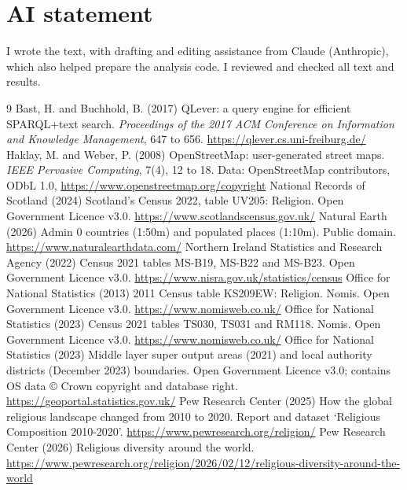 \documentclass[11pt,a4paper]{article}
\begin{document}
\section*{AI statement}
I wrote the text, with drafting and editing assistance from Claude (Anthropic), which also helped prepare the analysis code. I reviewed and checked all text and results.

\begin{thebibliography}{9}
 Bast, H. and Buchhold, B. (2017) QLever: a query engine for efficient SPARQL+text search. \emph{Proceedings of the 2017 ACM Conference on Information and Knowledge Management}, 647 to 656. \url{https://qlever.cs.uni-freiburg.de/}
 Haklay, M. and Weber, P. (2008) OpenStreetMap: user-generated street maps. \emph{IEEE Pervasive Computing}, 7(4), 12 to 18. Data: OpenStreetMap contributors, ODbL 1.0, \url{https://www.openstreetmap.org/copyright}
 National Records of Scotland (2024) Scotland's Census 2022, table UV205: Religion. Open Government Licence v3.0. \url{https://www.scotlandscensus.gov.uk/}
 Natural Earth (2026) Admin 0 countries (1:50m) and populated places (1:10m). Public domain. \url{https://www.naturalearthdata.com/}
 Northern Ireland Statistics and Research Agency (2022) Census 2021 tables MS-B19, MS-B22 and MS-B23. Open Government Licence v3.0. \url{https://www.nisra.gov.uk/statistics/census}
 Office for National Statistics (2013) 2011 Census table KS209EW: Religion. Nomis. Open Government Licence v3.0. \url{https://www.nomisweb.co.uk/}
 Office for National Statistics (2023) Census 2021 tables TS030, TS031 and RM118. Nomis. Open Government Licence v3.0. \url{https://www.nomisweb.co.uk/}
 Office for National Statistics (2023) Middle layer super output areas (2021) and local authority districts (December 2023) boundaries. Open Government Licence v3.0; contains OS data © Crown copyright and database right. \url{https://geoportal.statistics.gov.uk/}
 Pew Research Center (2025) How the global religious landscape changed from 2010 to 2020. Report and dataset `Religious Composition 2010-2020'. \url{https://www.pewresearch.org/religion/}
 Pew Research Center (2026) Religious diversity around the world. \url{https://www.pewresearch.org/religion/2026/02/12/religious-diversity-around-the-world}
\end{thebibliography}
\end{document}
